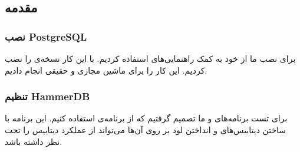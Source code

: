 \subsection{مقدمه}
\subsubsection{نصب PostgreSQL}
برای نصب
ما از
 خود 
به کمک راهنمایی‌های
استفاده کردیم. با این کار نسخه‌ی
را نصب کردیم. این کار را برای ماشین مجازی و حقیقی انجام دادیم.
\subsubsection{تنظیم HammerDB}
برای تست برنامه‌های
 و 
ما تصمیم گرفتیم که از برنامه‌ی
استفاده کنیم. این برنامه با ساختن دیتابیس‌های
و انداختن لود بر روی آن‌ها می‌تواند از عملکرد دیتابیس را تحت نظر داشته باشد.

